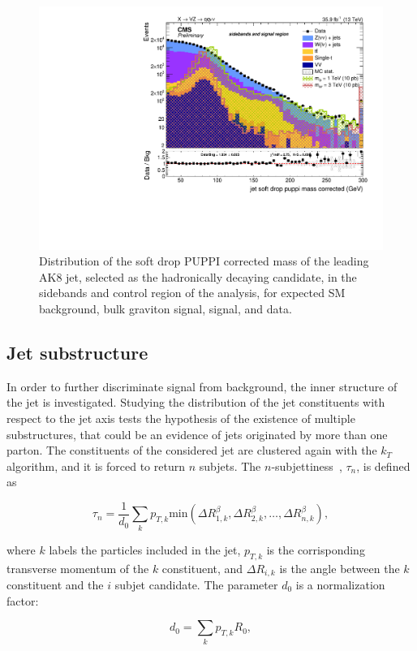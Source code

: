 \begin{figure}[!htb]
  \begin{center}
    \includegraphics[width=.495\textwidth]{figures/FatJet1_softdropPuppiMassCorr.pdf}
  \end{center}
  \caption{Distribution of the soft drop PUPPI corrected mass of the leading AK8 jet, selected as the hadronically decaying \V candidate, in the sidebands and control region of the analysis, for expected SM background, bulk graviton signal, \Wp signal, and data.}
  \label{fig:mj_paper}
\end{figure}


\subsection{Jet substructure}\label{ssec:jetsub}

In order to further discriminate signal from background, the inner structure of the jet is investigated. Studying the distribution of the jet constituents with respect to the jet axis tests the hypothesis of the existence of multiple substructures, that could be an evidence of jets originated by more than one parton. The constituents of the considered jet are clustered again with the $k_T$ algorithm, and it is forced to return $n$ subjets. The $n$-subjettiness~\cite{Thaler2011}, $\tau_n$, is defined as

\begin{equation}
\tau_n = \frac{1}{d_0} \sum_k p_{T,k} \text{min} \left( \Delta R_{1,k}^\beta, \Delta R_{2,k}^\beta, \dots, \Delta R_{n,k}^\beta \right),
\label{eq:n_subjettiness_def}
\end{equation}

\noindent where $k$ labels the particles included in the jet, $p_{T,k}$ is the corrisponding transverse momentum of the $k$ constituent, and $\Delta R_{i,k}$ is the angle between the $k$ constituent and the $i$ subjet candidate. The parameter $d_0$ is a normalization factor:

\begin{equation}
d_0 = \sum_k p_{T,k} R_0,
\label{eq:n_subjettiness_d0}
\end{equation}

